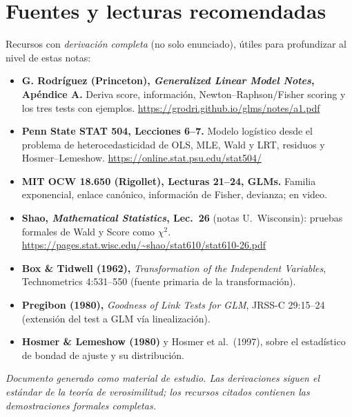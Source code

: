 \documentclass[11pt]{article}
\theoremstyle{plain}
\theoremstyle{definition}
\theoremstyle{remark}
\begin{document}
\section{Fuentes y lecturas recomendadas}

Recursos con \emph{derivación completa} (no solo enunciado), útiles para
profundizar al nivel de estas notas:

\begin{itemize}
  \item \textbf{G. Rodríguez (Princeton), \emph{Generalized Linear Model
        Notes}, Apéndice A.} Deriva score, información, Newton--Raphson/Fisher
        scoring y los tres tests con ejemplos.
        \url{https://grodri.github.io/glms/notes/a1.pdf}
  \item \textbf{Penn State STAT 504, Lecciones 6--7.} Modelo logístico desde el
        problema de heterocedasticidad de OLS, MLE, Wald y LRT, residuos y
        Hosmer--Lemeshow. \url{https://online.stat.psu.edu/stat504/}
  \item \textbf{MIT OCW 18.650 (Rigollet), Lecturas 21--24, GLMs.} Familia
        exponencial, enlace canónico, información de Fisher, devianza; en video.
  \item \textbf{Shao, \emph{Mathematical Statistics}, Lec.~26} (notas
        U.~Wisconsin): pruebas formales de Wald y Score como $\chi^2$.
        \url{https://pages.stat.wisc.edu/~shao/stat610/stat610-26.pdf}
  \item \textbf{Box \& Tidwell (1962),} \emph{Transformation of the Independent
        Variables}, Technometrics 4:531--550 (fuente primaria de la
        transformación).
  \item \textbf{Pregibon (1980),} \emph{Goodness of Link Tests for GLM}, JRSS-C
        29:15--24 (extensión del test a GLM vía linealización).
  \item \textbf{Hosmer \& Lemeshow (1980)} y Hosmer et al.\ (1997), sobre el
        estadístico de bondad de ajuste y su distribución.
\end{itemize}

\vfill
\begin{center}\small\itshape
Documento generado como material de estudio. Las derivaciones siguen el estándar
de la teoría de verosimilitud; los recursos citados contienen las demostraciones
formales completas.
\end{center}
\end{document}

